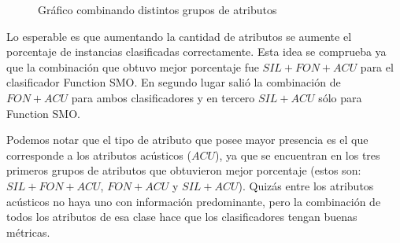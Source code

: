 \begin{figure}[H]
\caption{Gráfico combinando distintos grupos de atributos}
\label{comb_atrib_graf}
\end{figure}

Lo esperable es que aumentando la cantidad de atributos se aumente el porcentaje de instancias  clasificadas correctamente. Esta idea se comprueba ya que la combinación que obtuvo mejor porcentaje fue $SIL+FON+ACU$ para el clasificador Function SMO. En segundo lugar salió la combinación de $FON+ACU$ para ambos clasificadores y en tercero $SIL+ACU$ sólo para Function SMO. 

Podemos notar que el tipo de atributo que posee mayor presencia es el que corresponde a los atributos acústicos ($ACU$), ya que se encuentran en los tres primeros grupos de atributos que obtuvieron mejor porcentaje (estos son: $SIL+FON+ACU$, $FON+ACU$ y $SIL+ACU$). Quizás entre los atributos acústicos no haya uno con información predominante, pero la combinación de todos los atributos de esa clase hace que los clasificadores tengan buenas métricas.